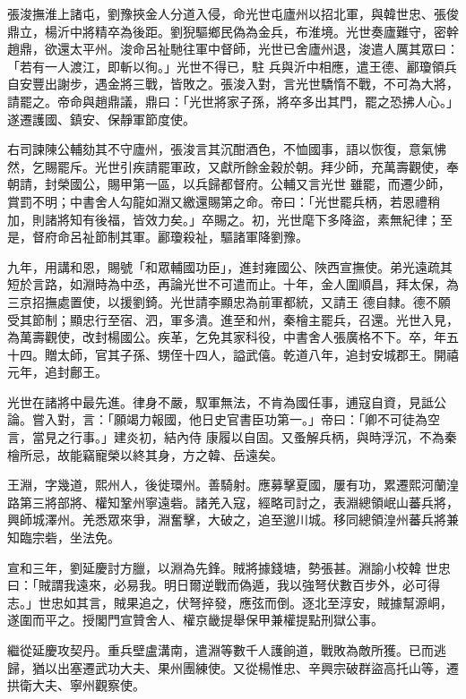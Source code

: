 \begin{pinyinscope}
 張浚撫淮上諸屯，劉豫挾金人分道入侵，命光世屯廬州以招北軍，與韓世忠、張俊鼎立，楊沂中將精卒為後距。劉猊驅鄉民偽為金兵，布淮境。光世奏廬難守，密幹趙鼎，欲還太平州。浚命呂祉馳往軍中督師，光世已舍廬州退，浚遣人厲其眾曰：「若有一人渡江，即斬以徇。」光世不得已，駐
 兵與沂中相應，遣王德、酈瓊領兵自安豐出謝步，遇金將三戰，皆敗之。張浚入對，言光世驕惰不戰，不可為大將，請罷之。帝命與趙鼎議，鼎曰：「光世將家子孫，將卒多出其門，罷之恐拂人心。」遂遷護國、鎮安、保靜軍節度使。



 右司諫陳公輔劾其不守廬州，張浚言其沉酣酒色，不恤國事，語以恢復，意氣怫然，乞賜罷斥。光世引疾請罷軍政，又獻所餘金穀於朝。拜少師，充萬壽觀使，奉朝請，封榮國公，賜甲第一區，以兵歸都督府。公輔又言光世
 雖罷，而遷少師，賞罰不明；中書舍人勾龍如淵又繳還賜第之命。帝曰：「光世罷兵柄，若恩禮稍加，則諸將知有後福，皆效力矣。」卒賜之。初，光世麾下多降盜，素無紀律；至是，督府命呂祉節制其軍。酈瓊殺祉，驅諸軍降劉豫。



 九年，用講和恩，賜號「和眾輔國功臣」，進封雍國公、陜西宣撫使。弟光遠疏其短於言路，如淵時為中丞，再論光世不可遣而止。十年，金人圍順昌，拜太保，為三京招撫處置使，以援劉錡。光世請李顯忠為前軍都統，又請王
 德自隸。德不願受其節制；顯忠行至宿、泗，軍多潰。進至和州，秦檜主罷兵，召還。光世入見，為萬壽觀使，改封楊國公。疾革，乞免其家科役，中書舍人張廣格不下。卒，年五十四。贈太師，官其子孫、甥侄十四人，謚武僖。乾道八年，追封安城郡王。開禧元年，追封鄜王。



 光世在諸將中最先進。律身不嚴，馭軍無法，不肯為國任事，逋寇自資，見詆公論。嘗入對，言：「願竭力報國，他日史官書臣功第一。」帝曰：「卿不可徒為空言，當見之行事。」建炎初，結內侍
 康履以自固。又蚤解兵柄，與時浮沉，不為秦檜所忌，故能竊寵榮以終其身，方之韓、岳遠矣。



 王淵，字幾道，熙州人，後徙環州。善騎射。應募擊夏國，屢有功，累遷熙河蘭湟路第三將部將、權知鞏州寧遠砦。諸羌入寇，經略司討之，表淵總領岷山蕃兵將，興師城澤州。羌悉眾來爭，淵奮擊，大破之，追至邈川城。移同總領湟州蕃兵將兼知臨宗砦，坐法免。



 宣和三年，劉延慶討方臘，以淵為先鋒。賊將據錢塘，勢張甚。淵諭小校韓
 世忠曰：「賊謂我遠來，必易我。明日爾逆戰而偽遁，我以強弩伏數百步外，必可得志。」世忠如其言，賊果追之，伏弩捽發，應弦而倒。逐北至淳安，賊據幫源峒，遂圍而平之。授閣門宣贊舍人、權京畿提舉保甲兼權提點刑獄公事。



 繼從延慶攻契丹。重兵壁盧溝南，遣淵等數千人護餉道，戰敗為敵所獲。已而逃歸，猶以出塞遷武功大夫、果州團練使。又從楊惟忠、辛興宗破群盜高托山等，遷拱衛大夫、寧州觀察使。




\end{pinyinscope}
